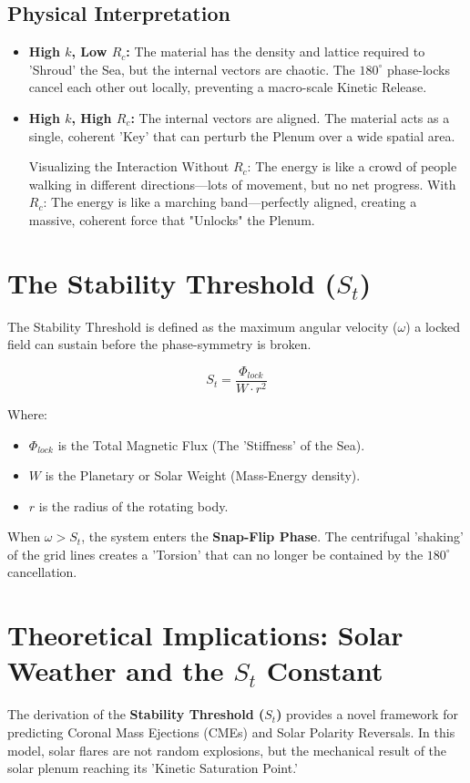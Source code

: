 \documentclass[11pt]{article}
\begin{document}
\subsection*{Physical Interpretation}
\begin{itemize}
    \item \textbf{High $k$, Low $R_c$:} The material has the density and lattice required to 'Shroud' the Sea, but the internal vectors are chaotic. The $180^\circ$ phase-locks cancel each other out locally, preventing a macro-scale Kinetic Release.
    \item \textbf{High $k$, High $R_c$:} The internal vectors are aligned. The material acts as a single, coherent 'Key' that can perturb the Plenum over a wide spatial area.

Visualizing the Interaction
Without $R_c$: 
The energy is like a crowd of people walking in different directions—lots of movement, but no net progress.
With $R_c$: 
The energy is like a marching band—perfectly aligned, creating a massive, coherent force that "Unlocks" the Plenum.
\end{itemize}

\section*{The Stability Threshold ($S_t$)}
The Stability Threshold is defined as the maximum angular velocity ($\omega$) a locked field can sustain before the phase-symmetry is broken. 

\begin{equation}
    S_t = \frac{\Phi_{lock}}{W \cdot r^2}
\end{equation}

Where:
\begin{itemize}
    \item $\Phi_{lock}$ is the Total Magnetic Flux (The 'Stiffness' of the Sea).
    \item $W$ is the Planetary or Solar Weight (Mass-Energy density).
    \item $r$ is the radius of the rotating body.
\end{itemize}

When $\omega > S_t$, the system enters the \textbf{Snap-Flip Phase}. The centrifugal 'shaking' of the grid lines creates a 'Torsion' that can no longer be contained by the $180^\circ$ cancellation.

\section*{Theoretical Implications: Solar Weather and the $S_t$ Constant}
The derivation of the \textbf{Stability Threshold ($S_t$)} provides a novel framework for predicting Coronal Mass Ejections (CMEs) and Solar Polarity Reversals. In this model, solar flares are not random explosions, but the mechanical result of the solar plenum reaching its 'Kinetic Saturation Point.' 
\end{document}
